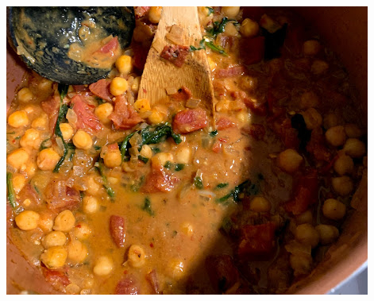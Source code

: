 \vspace{4mm}
\begin{center}
\includegraphics[scale=0.65]{Vegetarian Recipes/Coconut Chickpea Curry/chickpeacurry.jpg}
\end{center}